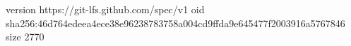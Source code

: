 version https://git-lfs.github.com/spec/v1
oid sha256:46d764edeea4ece38e96238783758a004cd9ffda9e645477f2003916a5767846
size 2770
